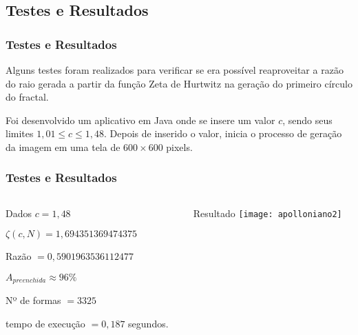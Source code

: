 \documentclass[aspectratio=169,11pt,red]{beamer}
\begin{document}
\subsection{Testes e Resultados}
\begin{frame}
\frametitle{Testes e Resultados}
Alguns testes foram realizados para verificar se era possível reaproveitar a razão do raio gerada a partir da função Zeta de Hurtwitz na geração do primeiro círculo do fractal.
\medskip

Foi desenvolvido um aplicativo em Java onde se insere um valor $c$, sendo seus limites $1,01 \leqslant c \leqslant 1,48$. Depois de inserido o valor, inicia o processo de geração da imagem em uma tela de $600 \times 600$ pixels.

\end{frame}

\begin{frame}
\frametitle{Testes e Resultados}
\begin{columns}[T]
\begin{column}{.5\textwidth}
\begin{block}{\centering Dados}
$c=1,48$
\smallskip

$\zeta(c,N)=1,694351369474375$
\smallskip

Razão $=0,5901963536112477$
\smallskip

$A_{preenchida} \approx 96\%$
\smallskip

Nº de formas $=3325$
\smallskip

tempo de execução $= 0,187$ segundos.
\smallskip
\end{block}
\end{column}

\begin{column}{.5\textwidth}
\begin{block}{\centering Resultado}
\centering
\texttt{[image: apolloniano2]}
\end{block}
\end{column}
\end{columns}
\end{frame}
\end{document}

